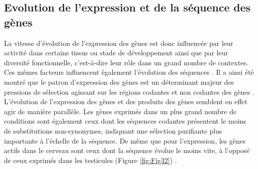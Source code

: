 \subsection{Evolution de l’expression et de la séquence des gènes}
\label{sub:evol-exp-seq}

La vitesse d’évolution de l’expression des gènes est donc influencée par leur activité dans certains tissus ou stade de développement ainsi que par leur diversité fonctionnelle, c’est-à-dire leur rôle dans un grand nombre de contextes. Ces mêmes facteurs influencent également l’évolution des séquences \citep{kuma_functional_1995,hastings_strong_1996}. Il a ainsi été montré que le patron d’expression des gènes est un déterminant majeur des pressions de sélection agissant sur les régions codantes et non codantes des gènes \citep{duret_determinants_2000}. L’évolution de l’expression des gènes et des produits des gènes semblent en effet agir de manière parallèle. Les gènes exprimés dans un plus grand nombre de \glspl{condition} sont également ceux dont les séquences codantes présentent le moins de substitutions non-synonymes, indiquant une sélection purifiante plus importante à l’échelle de la séquence. De même que pour l’expression, les gènes actifs dans le cerveau sont ceux dont la séquence évolue le moins vite, à l’opposé de ceux exprimés dans les testicules (Figure \ref{fig:Fig32}) \citep{khaitovich_parallel_2005}. 


